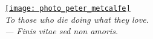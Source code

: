 %
%

\doublecol
	\onecolumngrid
\fi

\vspace*{180pt}
\begin{center}
	\href{https://youtu.be/fuF-z-Aq37o}{\texttt{[image: photo\_peter\_metcalfe]}}\\
	\textit{To those who die doing what they love.\\ --- Finis vitae sed non amoris.}
\end{center}
\newpage

\doublecol
	\twocolumngrid
\fi